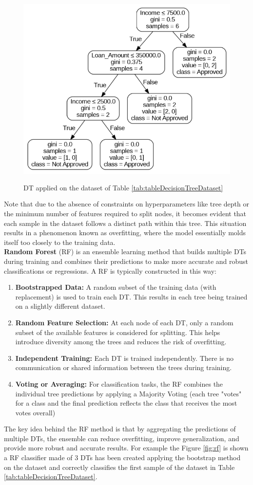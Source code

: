 \begin{figure}[H]
  \centering
  \includegraphics[width=0.6\linewidth]{graphics/DecTree.png}
  \label{fig:knn5}
  \caption{DT applied on the dataset of Table \ref{tab:tableDecisionTreeDataset}}
\end{figure}
Note that due to the absence of constraints on hyperparameters like tree depth or the minimum number of features required to split nodes, 
it becomes evident that each sample in the dataset follows a distinct path within this tree. 
This situation results in a phenomenon known as overfitting, where the model essentially molds itself too closely to the training data.\\

\textbf{Random Forest} (RF) is an ensemble learning method that builds multiple DTs during training and combines their predictions to make more accurate and robust classifications or regressions.
A RF is typically constructed in this way:
\begin{enumerate}
  \item \textbf{Bootstrapped Data:} A random subset of the training data (with replacement) is used to train each DT. This results in each tree being trained on a slightly different dataset.
  \item \textbf{Random Feature Selection:} At each node of each DT, only a random subset of the available features is considered for splitting. This helps introduce diversity among the trees and reduces the risk of overfitting.
  \item \textbf{Independent Training:} Each DT is trained independently. There is no communication or shared information between the trees during training.
  \item \textbf{Voting or Averaging:} For classification tasks, the RF combines the individual tree predictions by applying a Majority Voting (each tree "votes" for a class and the final prediction reflects the class that receives the most votes overall)
\end{enumerate}
The key idea behind the RF method is that by aggregating the predictions of multiple DTs, the ensemble can reduce overfitting, improve generalization, and provide more robust and accurate results.
For example the Figure \ref{fig:rf} is shown a RF classifier made of 3 DTs has been created applying the bootstrap method on the dataset and correctly classifies the first sample of the dataset in Table \ref{tab:tableDecisionTreeDataset}.

